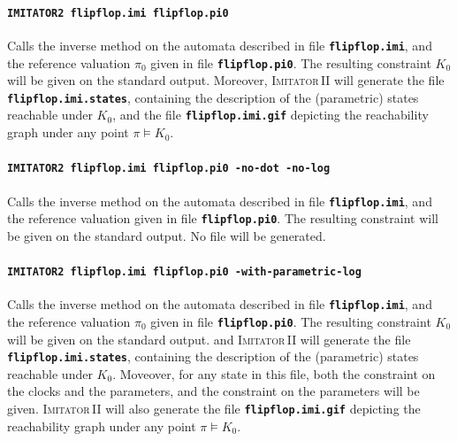 \documentclass[a4paper,10pt]{article}
\newcommand{\imitatordeux}{\textsc{Imitator}\,II}
\newcommand{\imitatordeuxExec}{\code{IMITATOR2}}
\newcommand{\code}[1]{\textbf{\texttt{#1}}}
\begin{document}
\paragraph{\code{\imitatordeuxExec{} flipflop.imi flipflop.pi0}}
Calls the inverse method on the automata described in file \code{flipflop.imi}, and the reference valuation $\pi_0$ given in file \code{flipflop.pi0}.
The resulting constraint $K_0$ will be given on the standard output.
Moreover, \imitatordeux{} will generate the file \code{flipflop.imi.states}, containing the description of the (parametric) states reachable under $K_0$, and the file \code{flipflop.imi.gif} depicting the reachability graph under any point $\pi \models K_0$.


\paragraph{\code{\imitatordeuxExec{} flipflop.imi flipflop.pi0 -no-dot -no-log}}
Calls the inverse method on the automata described in file \code{flipflop.imi}, and the reference valuation given in file \code{flipflop.pi0}.
The resulting constraint will be given on the standard output.
No file will be generated.


\paragraph{\code{\imitatordeuxExec{} flipflop.imi flipflop.pi0 -with-parametric-log}}
Calls the inverse method on the automata described in file \code{flipflop.imi}, and the reference valuation $\pi_0$ given in file \code{flipflop.pi0}.
The resulting constraint $K_0$ will be given on the standard output.
and \imitatordeux{} will generate the file \code{flipflop.imi.states}, containing the description of the (parametric) states reachable under $K_0$.
Moveover, for any state in this file, both the constraint on the clocks and the parameters, and the constraint on the parameters will be given.
\imitatordeux{} will also generate the file \code{flipflop.imi.gif} depicting the reachability graph under any point $\pi \models K_0$.

\end{document}
